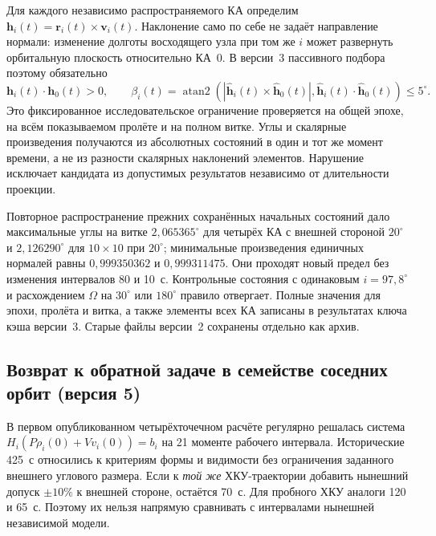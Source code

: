 \documentclass[a4paper,12pt]{article}
\begin{document}
Для каждого независимо распространяемого КА определим
$\mathbf h_i(t)=\mathbf r_i(t)\times\mathbf v_i(t)$.
Наклонение само по себе не задаёт направление нормали: изменение
долготы восходящего узла при том же $i$ может развернуть
орбитальную плоскость относительно КА~0. В версии~3 пассивного
подбора поэтому обязательно
\begin{equation}
 \mathbf h_i(t)\cdot\mathbf h_0(t)>0,\qquad
 \beta_i(t)=\operatorname{atan2}\!\left(
  |\widehat{\mathbf h}_i(t)\times\widehat{\mathbf h}_0(t)|,
  \widehat{\mathbf h}_i(t)\cdot\widehat{\mathbf h}_0(t)
 \right)\leq5^\circ.
\end{equation}
Это фиксированное исследовательское ограничение проверяется
на общей эпохе, на всём показываемом пролёте и на полном витке.
Углы и скалярные произведения получаются из абсолютных
состояний в один и тот же момент времени, а не из разности
скалярных наклонений элементов. Нарушение исключает кандидата
из допустимых результатов независимо от длительности проекции.

Повторное распространение прежних сохранённых начальных состояний
дало максимальные углы на витке $2{,}065365^\circ$ для четырёх
КА с внешней стороной $20^\circ$ и $2{,}126290^\circ$ для
$10\times10$ при $20^\circ$; минимальные произведения
единичных нормалей равны $0{,}999350362$ и $0{,}999311475$.
Они проходят новый предел без изменения интервалов 80 и 10~с.
Контрольные состояния с одинаковым $i=97{,}8^\circ$ и
расхождением $\Omega$ на $30^\circ$ или $180^\circ$
правило отвергает. Полные значения для эпохи, пролёта и витка,
а также элементы всех КА записаны в результатах ключа кэша
версии~3. Старые файлы версии~2 сохранены отдельно как архив.

\subsection{Возврат к обратной задаче в семействе соседних орбит (версия 5)}

В первом опубликованном четырёхточечном расчёте регулярно решалась
система $H_i(P\rho_i(0)+Vv_i(0))=b_i$ на 21 моменте рабочего
интервала. Исторические 425~с относились к критериям формы и
видимости без ограничения заданного внешнего углового размера.
Если к \emph{той же} ХКУ-траектории добавить нынешний допуск
$\pm10\%$ к внешней стороне, остаётся 70~с. Для пробного ХКУ
аналоги 120 и 65~с. Поэтому их нельзя напрямую сравнивать
с интервалами нынешней независимой модели.
\end{document}

